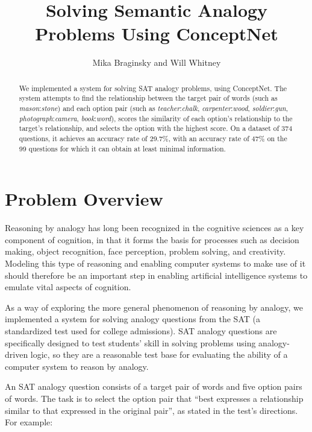 \documentclass[11pt]{article}
\begin{document}

\title{Solving Semantic Analogy Problems Using ConceptNet}
\author{Mika Braginsky and Will Whitney}
\maketitle

\begin{abstract}
We implemented a system for solving SAT analogy problems, using ConceptNet. The system attempts to find the relationship between the target pair of words (such as \emph{mason}:\emph{stone}) and each option pair (such as \emph{teacher}:\emph{chalk}, \emph{carpenter}:\emph{wood}, \emph{soldier}:\emph{gun}, \emph{photograph}:\emph{camera}, \emph{book}:\emph{word}), scores the similarity of each option's relationship to the target's relationship, and selects the option with the highest score. On a dataset of 374 questions, it achieves an accuracy rate of 29.7\%, with an accuracy rate of 47\% on the 99 questions for which it can obtain at least minimal information.
\end{abstract}

\section{Problem Overview}

Reasoning by analogy has long been recognized in the cognitive sciences as a key component of cognition, in that it forms the basis for processes such as decision making, object recognition, face perception, problem solving, and creativity. Modeling this type of reasoning and enabling computer systems to make use of it should therefore be an important step in enabling artificial intelligence systems to emulate vital aspects of cognition.

As a way of exploring the more general phenomenon of reasoning by analogy, we implemented a system for solving analogy questions from the SAT (a standardized test used for college admissions). SAT analogy questions are specifically designed to test students' skill in solving problems using analogy-driven logic, so they are a reasonable test base for evaluating the ability of a computer system to reason by analogy.

An SAT analogy question consists of a target pair of words and five option pairs of words. The task is to select the option pair that ``best expresses a relationship similar to that expressed in the original pair'', as stated in the test's directions. For example:
\end{document}
